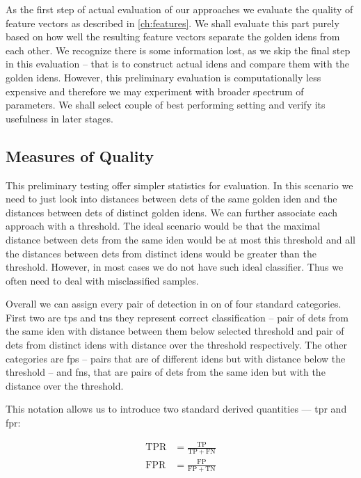 As the first step of actual evaluation of our approaches we evaluate the
quality of feature vectors as described in \autoref{ch:features}. We shall
evaluate this part purely based on how well the resulting feature vectors
separate the golden \glspl{iden} from each other. We recognize there is some
information lost, as we skip the final step in this evaluation -- that is to
construct actual \glspl{iden} and compare them with the golden \glspl{iden}.
However, this preliminary evaluation is computationally less expensive and
therefore we may experiment with broader spectrum of parameters. We shall
select couple of best performing setting and verify its usefulness in later
stages.

\subsection{Measures of Quality}

This preliminary testing offer simpler statistics for evaluation. In this scenario we need to just look into distances between \glspl{det} of the same golden \gls{iden} and the distances between \glspl{det} of distinct golden \glspl{iden}. We can further associate each approach with a threshold. The ideal scenario would be that the maximal distance between \glspl{det} from the same \gls{iden} would be at most this threshold and all the distances between \glspl{det} from distinct \glspl{iden} would be greater than the threshold. However, in most cases we do not have such ideal classifier. Thus we often need to deal with misclassified samples.

Overall we can assign every pair of detection in on of four standard categories. First two are \glspl{tp} and \glspl{tn} they represent correct classification -- pair of \glspl{det} from the same \gls{iden} with distance between them below selected threshold and pair of \glspl{det} from distinct \glspl{iden} with distance over the threshold respectively. The other categories are \glspl{fp} -- pairs that are of different \glspl{iden} but with distance below the threshold -- and \glspl{fn}, that are pairs of \glspl{det} from the same \gls{iden} but with the distance over the threshold.

This notation allows us to introduce two standard derived quantities --- \gls{tpr} and \gls{fpr}:

\begin{align*}
    \mathrm{TPR} &= \frac{\mathrm{TP}}{\mathrm{TP} + \mathrm{FN}} \\
    \mathrm{FPR} &= \frac{\mathrm{FP}}{\mathrm{FP} + \mathrm{TN}}
\end{align*}

